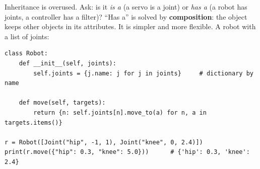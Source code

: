 \begin{keyidea}
Inheritance is overused. Ask: is it \emph{is a} (a servo is a joint) or \emph{has a} (a robot has joints, a controller has a filter)? ``Has a'' is solved by \textbf{composition}: the object keeps other objects in its attributes. It is simpler and more flexible. A robot with a list of joints:
\end{keyidea}
\begin{verbatim}
class Robot:
    def __init__(self, joints):
        self.joints = {j.name: j for j in joints}     # dictionary by name

    def move(self, targets):
        return {n: self.joints[n].move_to(a) for n, a in targets.items()}

r = Robot([Joint("hip", -1, 1), Joint("knee", 0, 2.4)])
print(r.move({"hip": 0.3, "knee": 5.0}))      # {'hip': 0.3, 'knee': 2.4}
\end{verbatim}

